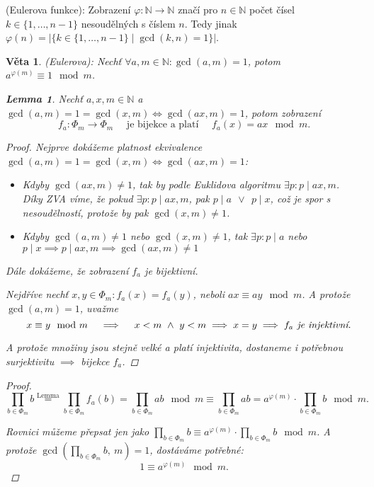\documentclass[10pt,a4paper]{article}
\newtheorem{veta}{Věta}
\newtheorem{lemma}{Lemma}
\newcommand{\N}{{\mathbb{N}}}       %
\begin{document}
 (Eulerova funkce): \normalfont Zobrazení $\varphi: \N \to \N$  značí pro $n\in \N$ počet čísel $k \in \{1, \ldots, n-1\}$ nesoudělných s číslem $n$. 
Tedy jinak $\varphi(n) = |\{k \in \{1, \dots, n-1\} \mid \gcd(k, n) = 1\}|$.
\newpage
\begin{veta} (Eulerova): \normalfont
    Nechť $\forall a,m \in \N: \gcd(a,m) = 1$, potom $a^{\varphi(m)} \equiv 1 \mod m$.

    \begin{addmargin}[2em]{0em}
    \begin{lemma} \normalfont
        Nechť $a, x, m \in \N$ a $\gcd(a,m) = 1 = \gcd(x,m) \iff \gcd(ax, m) = 1$, potom zobrazení 
        \[
            f_a : \Phi_m \to \Phi_m \quad \text{ je bijekce a platí } \quad f_a(x) = ax \mod m.
        \]
    
        \begin{proof}
            Nejprve dokážeme platnost ekvivalence $\gcd(a,m) = 1 = \gcd(x,m) \iff \gcd(ax, m) = 1$:
        
            \begin{itemize}
                \item [$\implies$] Kdyby $\gcd(ax, m) \neq 1$, tak by podle Euklidova algoritmu $\exists p: p \mid ax, m$. Díky ZVA víme, že pokud $\exists p: p \mid ax, m$, pak $p \mid a~~\lor~~ p \mid x$, což je spor s nesoudělností, protože by pak $\gcd(x,m)\neq 1$.
                \item [$\Longleftarrow$] Kdyby $\gcd(a, m) \neq 1$ nebo $\gcd(x, m) \neq 1$, tak $\exists p: p \mid a$ nebo $ p \mid x \implies p\mid ax,m \implies \gcd(ax,m)\neq 1$
            \end{itemize}
            
            Dále dokážeme, že zobrazení $f_a$ je bijektivní.
        
            Nejdříve nechť $x,y \in \Phi_m: f_a(x) = f_a(y)$, neboli $ax \equiv ay \mod m$.  
            A protože $\gcd(a,m)=1$, uvažme $$\quad x\equiv y \mod m \quad \implies \quad x<m ~\land~ y < m \implies x=y \implies f_a \textit{ je \textit{injektivní}}.$$
            
            A protože množiny jsou stejně velké a platí injektivita, dostaneme i potřebnou \textit{surjektivitu} $\implies$ \textit{bijekce} $f_a$.
        \end{proof}
    \end{lemma}
    \end{addmargin}

    \begin{proof}
        \[
            \prod_{b\in \Phi_m}b \stackrel{\text{Lemma}}{=} 
            \prod_{b\in \Phi_m} f_a(b) = 
            \prod_{b\in \Phi_m} ab \mod m \equiv
            \prod_{b\in \Phi_m} ab  = 
            a^{\varphi(m)} \cdot \prod_{b\in \Phi_m}b \mod m.
        \]

        Rovnici můžeme přepsat jen jako $\displaystyle \prod_{b\in \Phi_m}b \equiv a^{\varphi(m)} \cdot \prod_{b\in \Phi_m}b \mod m$.
        A protože $\gcd\left(\displaystyle \prod_{b\in \Phi_m}b,~m\right) = 1$, dostáváme potřebné: $$1 \equiv a^{\varphi(m)} \mod m.$$
    \end{proof}
\end{veta}
\end{document}
